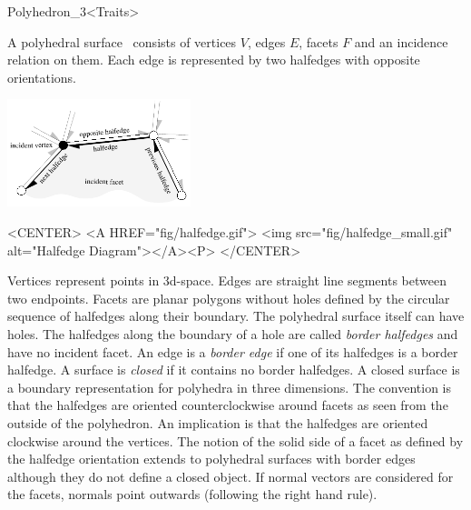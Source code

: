 
\ccRefPageBegin



\begin{ccRefClass}{Polyhedron_3<Traits>}

\ccDefinition

A polyhedral surface \ccClassTemplateName\ consists of vertices $V$,
edges $E$, facets $F$ and an incidence relation on them.  Each edge is
represented by two halfedges with opposite orientations.

\begin{ccTexOnly}
    \vspace{-7mm}
    \begin{center}
      \parbox{0.4\textwidth}{%
        \includegraphics[width=0.4\textwidth]{Polyhedron_ref/fig/halfedge}%
      }
    \end{center}
    \vspace{-5mm}
\end{ccTexOnly}

\begin{ccHtmlOnly}
    <CENTER>
    <A HREF="fig/halfedge.gif">
        <img src="fig/halfedge_small.gif" alt="Halfedge Diagram"></A><P>
    </CENTER>
\end{ccHtmlOnly}

Vertices represent points in 3d-space. Edges are straight line segments
between two endpoints. Facets are planar polygons without holes
defined by the circular sequence of halfedges along their boundary.
The polyhedral surface itself can have holes. The halfedges
along the boundary of a hole are called {\em border halfedges\/} and
have no incident facet. An edge is a {\em border edge\/} if one of
its halfedges is a border halfedge.  A surface is {\em closed\/} if it
contains no border halfedges. A closed surface is a boundary
representation for polyhedra in three dimensions. The convention is
that the halfedges are oriented counterclockwise around facets as seen
from the outside of the polyhedron. An implication is that the
halfedges are oriented clockwise around the vertices. The notion of
the solid side of a facet as defined by the halfedge orientation
extends to polyhedral surfaces with border edges although they do not
define a closed object. If normal vectors are considered for the
facets, normals point outwards (following the right hand rule).


\end{ccRefClass}
